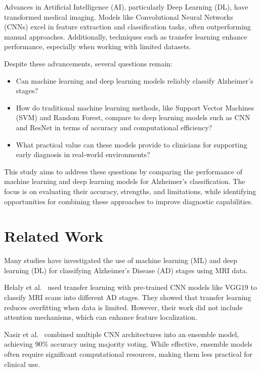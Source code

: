 \documentclass[runningheads]{llncs}
\begin{document}
Advances in Artificial Intelligence (AI), particularly Deep Learning (DL), have transformed medical imaging. Models like Convolutional Neural Networks (CNNs) excel in feature extraction and classification tasks, often outperforming manual approaches. Additionally, techniques such as transfer learning enhance performance, especially when working with limited datasets.

Despite these advancements, several questions remain:
\begin{itemize}
    \item Can machine learning and deep learning models reliably classify Alzheimer's stages?
    \item How do traditional machine learning methods, like Support Vector Machines (SVM) and Random Forest, compare to deep learning models such as CNN and ResNet in terms of accuracy and computational efficiency?
    \item What practical value can these models provide to clinicians for supporting early diagnosis in real-world environments?
\end{itemize}

This study aims to address these questions by comparing the performance of machine learning and deep learning models for Alzheimer's classification. The focus is on evaluating their accuracy, strengths, and limitations, while identifying opportunities for combining these approaches to improve diagnostic capabilities.

\section{Related Work}

Many studies have investigated the use of machine learning (ML) and deep learning (DL) for classifying Alzheimer's Disease (AD) stages using MRI data.

Helaly et al.~\cite{helaly2021} used transfer learning with pre-trained CNN models like VGG19 to classify MRI scans into different AD stages. They showed that transfer learning reduces overfitting when data is limited. However, their work did not include attention mechanisms, which can enhance feature localization.

Nasir et al.~\cite{nasir2021} combined multiple CNN architectures into an ensemble model, achieving 90\% accuracy using majority voting. While effective, ensemble models often require significant computational resources, making them less practical for clinical use.
\end{document}
